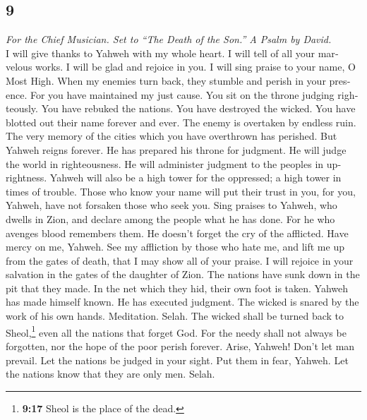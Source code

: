 \begin{paracol}{2}
\switchcolumn
\begin{otherlanguage}{english}

\hypertarget{section-17}{%
\section{9}\label{section-17}}

\emph{For the Chief Musician. Set to ``The Death of the Son.'' A Psalm
by David.}\\
 I will give thanks to Yahweh with my whole heart. I will
tell of all your marvelous works.  I will be glad and
rejoice in you. I will sing praise to your name, O Most High.
 When my enemies turn back, they stumble and perish in
your presence.  For you have maintained my just cause. You
sit on the throne judging righteously.  You have rebuked
the nations. You have destroyed the wicked. You have blotted out their
name forever and ever.  The enemy is overtaken by endless
ruin. The very memory of the cities which you have overthrown has
perished.  But Yahweh reigns forever. He has prepared his
throne for judgment.  He will judge the world in
righteousness. He will administer judgment to the peoples in
uprightness.  Yahweh will also be a high tower for the
oppressed; a high tower in times of trouble.  Those who
know your name will put their trust in you, for you, Yahweh, have not
forsaken those who seek you.  Sing praises to Yahweh, who
dwells in Zion, and declare among the people what he has done.
 For he who avenges blood remembers them. He doesn't
forget the cry of the afflicted.  Have mercy on me,
Yahweh. See my affliction by those who hate me, and lift me up from the
gates of death,  that I may show all of your praise. I
will rejoice in your salvation in the gates of the daughter of Zion.
 The nations have sunk down in the pit that they made. In
the net which they hid, their own foot is taken.  Yahweh
has made himself known. He has executed judgment. The wicked is snared
by the work of his own hands. Meditation. Selah.  The
wicked shall be turned back to Sheol,\footnote{\textbf{9:17} Sheol is
  the place of the dead.} even all the nations that forget God.
 For the needy shall not always be forgotten, nor the
hope of the poor perish forever.  Arise, Yahweh! Don't
let man prevail. Let the nations be judged in your sight.
 Put them in fear, Yahweh. Let the nations know that they
are only men. Selah.


\end{otherlanguage}
\end{paracol}
